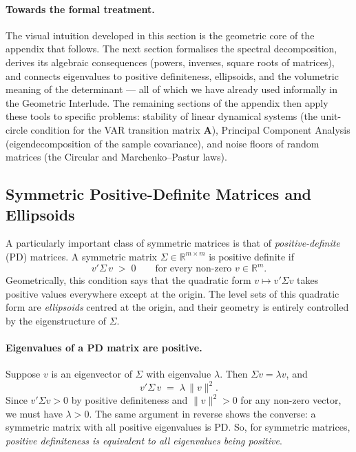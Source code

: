 \documentclass[11pt, a4paper, oneside]{article}
\begin{document}
\paragraph{Towards the formal treatment.}
The visual intuition developed in this section is the geometric core
of the appendix that follows. The next section formalises the
spectral decomposition, derives its algebraic consequences (powers,
inverses, square roots of matrices), and connects eigenvalues to
positive definiteness, ellipsoids, and the volumetric meaning of the
determinant — all of which we have already used informally in the
Geometric Interlude. The remaining sections of the appendix then
apply these tools to specific problems: stability of linear
dynamical systems (the unit-circle condition for the VAR transition
matrix $\mathbf{A}$), Principal Component Analysis (eigendecomposition
of the sample covariance), and noise floors of random matrices (the
Circular and Marchenko–Pastur laws).

\subsection{Symmetric Positive-Definite Matrices and Ellipsoids}
\label{sec:appendix-ellipsoid}

A particularly important class of symmetric matrices is that of
\emph{positive-definite} (PD) matrices. A symmetric matrix
$\Sigma \in \mathbb{R}^{m \times m}$ is positive definite if
\[
v' \Sigma\, v \;>\; 0 \qquad \text{for every non-zero } v \in \mathbb{R}^m.
\]
Geometrically, this condition says that the quadratic form
$v \mapsto v' \Sigma v$ takes positive values everywhere except at
the origin. The level sets of this quadratic form are
\emph{ellipsoids} centred at the origin, and their geometry is
entirely controlled by the eigenstructure of $\Sigma$.

\paragraph{Eigenvalues of a PD matrix are positive.}
Suppose $v$ is an eigenvector of $\Sigma$ with eigenvalue $\lambda$.
Then $\Sigma v = \lambda v$, and
\[
v' \Sigma\, v \;=\; \lambda\, \|v\|^2.
\]
Since $v' \Sigma v > 0$ by positive definiteness and
$\|v\|^2 > 0$ for any non-zero vector, we must have $\lambda > 0$.
The same argument in reverse shows the converse: a symmetric matrix
with all positive eigenvalues is PD. So, for symmetric matrices,
\emph{positive definiteness is equivalent to all eigenvalues being
positive}.
\end{document}
